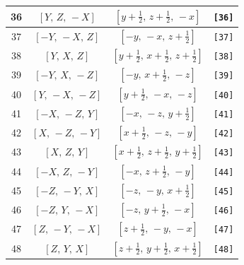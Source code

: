 \documentclass[fleqn,8pt]{jsarticle}
\begin{document}
\begin{longtable}{cccc}
36 & $\left[ Y,\, Z,\, - X \right]$ & $\left[ y + \frac{1}{2},\, z + \frac{1}{2},\, - x \right]$ & {\tt [36]} \\ \hline
37 & $\left[ - Y,\, - X,\, Z \right]$ & $\left[ - y,\, - x,\, z + \frac{1}{2} \right]$ & {\tt [37]} \\ \hline
38 & $\left[ Y,\, X,\, Z \right]$ & $\left[ y + \frac{1}{2},\, x + \frac{1}{2},\, z + \frac{1}{2} \right]$ & {\tt [38]} \\ \hline
39 & $\left[ - Y,\, X,\, - Z \right]$ & $\left[ - y,\, x + \frac{1}{2},\, - z \right]$ & {\tt [39]} \\ \hline
40 & $\left[ Y,\, - X,\, - Z \right]$ & $\left[ y + \frac{1}{2},\, - x,\, - z \right]$ & {\tt [40]} \\ \hline
41 & $\left[ - X,\, - Z,\, Y \right]$ & $\left[ - x,\, - z,\, y + \frac{1}{2} \right]$ & {\tt [41]} \\ \hline
42 & $\left[ X,\, - Z,\, - Y \right]$ & $\left[ x + \frac{1}{2},\, - z,\, - y \right]$ & {\tt [42]} \\ \hline
43 & $\left[ X,\, Z,\, Y \right]$ & $\left[ x + \frac{1}{2},\, z + \frac{1}{2},\, y + \frac{1}{2} \right]$ & {\tt [43]} \\ \hline
44 & $\left[ - X,\, Z,\, - Y \right]$ & $\left[ - x,\, z + \frac{1}{2},\, - y \right]$ & {\tt [44]} \\ \hline
45 & $\left[ - Z,\, - Y,\, X \right]$ & $\left[ - z,\, - y,\, x + \frac{1}{2} \right]$ & {\tt [45]} \\ \hline
46 & $\left[ - Z,\, Y,\, - X \right]$ & $\left[ - z,\, y + \frac{1}{2},\, - x \right]$ & {\tt [46]} \\ \hline
47 & $\left[ Z,\, - Y,\, - X \right]$ & $\left[ z + \frac{1}{2},\, - y,\, - x \right]$ & {\tt [47]} \\ \hline
48 & $\left[ Z,\, Y,\, X \right]$ & $\left[ z + \frac{1}{2},\, y + \frac{1}{2},\, x + \frac{1}{2} \right]$ & {\tt [48]} \\
\end{longtable}
\end{document}
